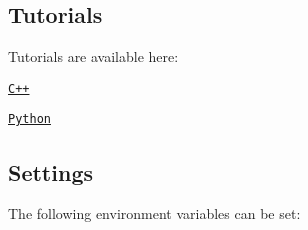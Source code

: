 \subsection*{Tutorials}

Tutorials are available here\+:


\begin{DoxyItemize}
\item \href{./tutorials/cpp}{\tt C++}
\item \href{./tutorials/python}{\tt Python}
\end{DoxyItemize}

\subsection*{Settings}

The following environment variables can be set\+:

